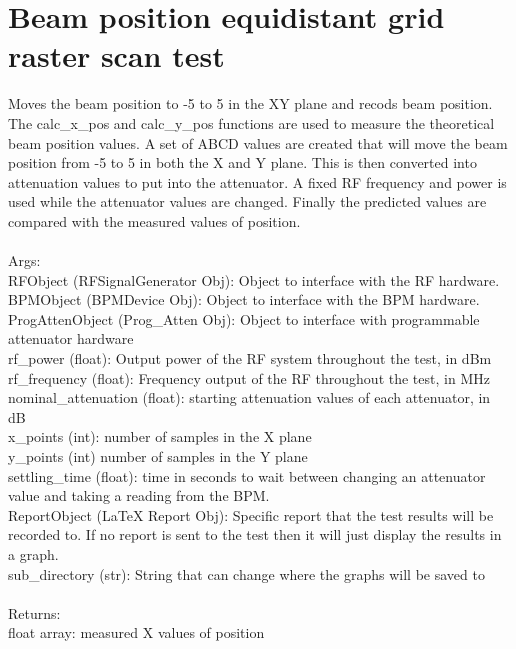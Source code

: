 \documentclass[a4paper, 11pt]{article}%
\begin{document}
\section{Beam position equidistant grid raster scan test}%
Moves the beam position to -5 to 5 in the XY plane and recods beam position.
    The calc\_x\_pos and calc\_y\_pos functions are used to measure the theoretical beam position values.
    A set of ABCD values are created that will move the beam position from -5 to 5 in both the X and Y
    plane. This is then converted into attenuation values to put into the attenuator. A fixed RF frequency 
    and power is used while the attenuator values are changed. Finally the predicted values are compared 
    with the measured values of position. \\~\\
    Args:\\
        RFObject (RFSignalGenerator Obj): Object to interface with the RF hardware.\\
        BPMObject (BPMDevice Obj): Object to interface with the BPM hardware.\\
        ProgAttenObject (Prog\_Atten Obj): Object to interface with programmable attenuator hardware\\
        rf\_power (float): Output power of the RF system throughout the test, in dBm \\
        rf\_frequency (float): Frequency output of the RF throughout the test, in MHz\\
        nominal\_attenuation (float): starting attenuation values of each attenuator, in dB\\
        x\_points (int): number of samples in the X plane\\
        y\_points (int) number of samples in the Y plane \\
        settling\_time (float): time in seconds to wait between changing an attenuator value and 
            taking a reading from the BPM. \\
        ReportObject (LaTeX Report Obj): Specific report that the test results will be recorded 
            to. If no report is sent to the test then it will just display the results in 
            a graph. \\
        sub\_directory (str): String that can change where the graphs will be saved to\\~\\
    Returns:\\
        float array: measured X values of position\\
\end{document}
